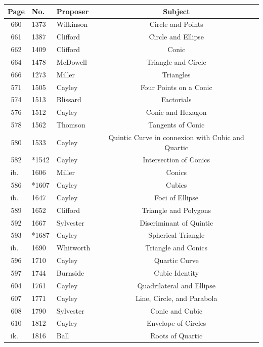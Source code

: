 \documentclass[12pt,a4paper]{article}
\theoremstyle{plain}
\begin{document}
\vspace{0.3cm}
\begin{center}
\begin{longtable}{clp{6cm}c}
\toprule
\textbf{Page} & \textbf{No.} & \textbf{Proposer} & \textbf{Subject} \\
\midrule
\endhead
660 & 1373 & Wilkinson & Circle and Points \\
661 & 1387 & Clifford & Circle and Ellipse \\
662 & 1409 & Clifford & Conic \\
664 & 1478 & McDowell & Triangle and Circle \\
666 & 1273 & Miller & Triangles \\
571 & 1505 & Cayley & Four Points on a Conic \\
574 & 1513 & Blissard & Factorials \\
576 & 1512 & Cayley & Conic and Hexagon \\
578 & 1562 & Thomson & Tangents of Conic \\
580 & 1533 & Cayley & Quintic Curve in connexion with Cubic and Quartic \\
582 & *1542 & Cayley & Intersection of Conics \\
ib.\ & 1606 & Miller & Conics \\
586 & *1607 & Cayley & Cubics \\
ib.\ & 1647 & Cayley & Foci of Ellipse \\
589 & 1652 & Clifford & Triangle and Polygons \\
592 & 1667 & Sylvester & Discriminant of Quintic \\
593 & *1687 & Cayley & Spherical Triangle \\
ib.\ & 1690 & Whitworth & Triangle and Conics \\
596 & 1710 & Cayley & Quartic Curve \\
597 & 1744 & Burnside & Cubic Identity \\
604 & 1761 & Cayley & Quadrilateral and Ellipse \\
607 & 1771 & Cayley & Line, Circle, and Parabola \\
608 & 1790 & Sylvester & Conic and Cubic \\
610 & 1812 & Cayley & Envelope of Circles \\
ik.\ & 1816 & Ball & Roots of Quartic \\
\bottomrule
\end{longtable}
\end{center}
\end{document}
